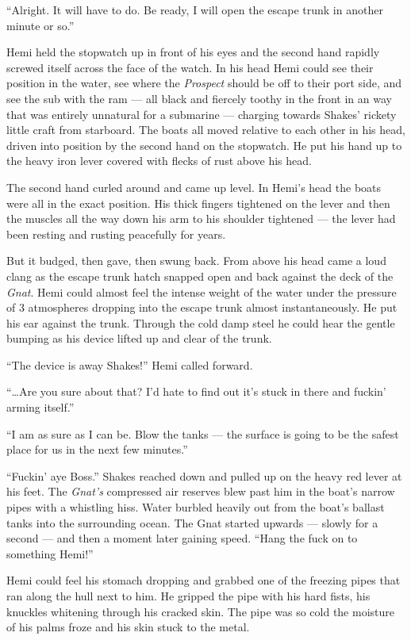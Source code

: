 \documentclass[
]{scrbook}
\begin{document}
``Alright. It will have to do. Be ready, I will open the escape trunk in
another minute or so.''

Hemi held the stopwatch up in front of his eyes and the second hand
rapidly screwed itself across the face of the watch. In his head Hemi
could see their position in the water, see where the \emph{Prospect}
should be off to their port side, and see the sub with the ram --- all
black and fiercely toothy in the front in an way that was entirely
unnatural for a submarine --- charging towards Shakes' rickety little
craft from starboard. The boats all moved relative to each other in his
head, driven into position by the second hand on the stopwatch. He put
his hand up to the heavy iron lever covered with flecks of rust above
his head.

The second hand curled around and came up level. In Hemi's head the
boats were all in the exact position. His thick fingers tightened on the
lever and then the muscles all the way down his arm to his shoulder
tightened --- the lever had been resting and rusting peacefully for
years.

But it budged, then gave, then swung back. From above his head came a
loud clang as the escape trunk hatch snapped open and back against the
deck of the \emph{Gnat}. Hemi could almost feel the intense weight of
the water under the pressure of 3 atmospheres dropping into the escape
trunk almost instantaneously. He put his ear against the trunk. Through
the cold damp steel he could hear the gentle bumping as his device
lifted up and clear of the trunk.

``The device is away Shakes!'' Hemi called forward.

``\ldots Are you sure about that? I'd hate to find out it's stuck in
there and fuckin' arming itself.''

``I am as sure as I can be. Blow the tanks --- the surface is going to
be the safest place for us in the next few minutes.''

``Fuckin' aye Boss.'' Shakes reached down and pulled up on the heavy red
lever at his feet. The \emph{Gnat's} compressed air reserves blew past
him in the boat's narrow pipes with a whistling hiss. Water burbled
heavily out from the boat's ballast tanks into the surrounding ocean.
The Gnat started upwards --- slowly for a second --- and then a moment
later gaining speed. ``Hang the fuck on to something Hemi!''

Hemi could feel his stomach dropping and grabbed one of the freezing
pipes that ran along the hull next to him. He gripped the pipe with his
hard fists, his knuckles whitening through his cracked skin. The pipe
was so cold the moisture of his palms froze and his skin stuck to the
metal.
\end{document}
